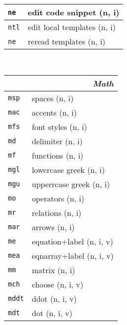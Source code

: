 \documentclass[oneside,10pt,landscape,DIV17]{scrartcl}
\newcommand{\Map}[1] {\textbf{\textasciiacute}\texttt{#1}}
\begin{document}
\begin{multicols}{3}
\begin{center}
\begin{tabular}[]{|p{11mm}|p{60mm}|}
\hline \Map{ne}  & edit code snippet         \hfill (n, i)   \\
\hline \Map{ntl} & edit local templates      \hfill (n, i)   \\
\hline \Map{ne}  & reread templates          \hfill (n, i)   \\
\hline
%
\end{tabular}\\
%
\begin{tabular}[]{|p{11mm}|p{62mm}|}
\hline
\multicolumn{2}{|r|}{\textsl{\textbf{M}ath}}  \\[1.0ex]
\hline	\Map{msp} & spaces                    \hfill (n, i)\\
\hline	\Map{mac} & accents                   \hfill (n, i)\\
\hline	\Map{mfs} & font styles               \hfill (n, i)\\
\hline	\Map{md}  & delimiter                 \hfill (n, i)\\
\hline	\Map{mf}  & functions                 \hfill (n, i)\\
\hline	\Map{mgl} & lowercase  greek          \hfill (n, i)\\
\hline	\Map{mgu} & upperrcase greek          \hfill (n, i)\\
\hline	\Map{mo}  & operators                 \hfill (n, i)\\
\hline	\Map{mr}  & relations                 \hfill (n, i)\\
\hline	\Map{mar} & arrows                    \hfill (n, i)\\
\hline	\Map{me}  & equation+label            \hfill (n, i, v)\\
\hline	\Map{mea} & eqnarray+label            \hfill (n, i, v)\\
\hline	\Map{mm}  & matrix                    \hfill (n, i)\\
\hline	\Map{mch} & choose                    \hfill (n, i, v)\\
\hline	\Map{mddt}& ddot                      \hfill (n, i, v)\\
\hline	\Map{mdt} & dot                       \hfill (n, i, v)\\

\end{tabular}
\end{center}
\end{multicols}
\end{document}
